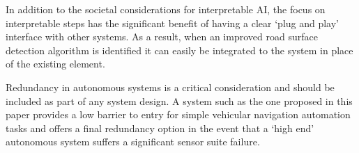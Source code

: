 \documentclass[]{aiaa-tc}%
\begin{document}
In addition to the societal considerations for interpretable AI, the focus on interpretable steps has the significant benefit of having a clear `plug and play' interface with other systems. As a result, when an improved road surface detection algorithm is identified it can easily be integrated to the system in place of the existing element. 

Redundancy in autonomous systems is a critical consideration and should be included as part of any system design. A system such as the one proposed in this paper provides a low barrier to entry for simple vehicular navigation automation tasks and offers a final redundancy option in the event that a `high end' autonomous system suffers a significant sensor suite failure.




\newpage



%
%
%
\end{document}
